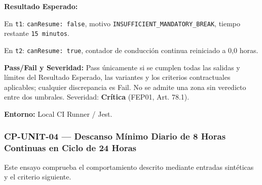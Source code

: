 \par\noindent\textbf{Resultado Esperado:} \par
   En \texttt{t\allowbreak{}1\allowbreak{}}: \texttt{c\allowbreak{}a\allowbreak{}n\allowbreak{}R\allowbreak{}e\allowbreak{}s\allowbreak{}u\allowbreak{}m\allowbreak{}e\allowbreak{}:\allowbreak{} f\allowbreak{}a\allowbreak{}l\allowbreak{}s\allowbreak{}e\allowbreak{}}, motivo \texttt{I\allowbreak{}N\allowbreak{}S\allowbreak{}U\allowbreak{}F\allowbreak{}F\allowbreak{}I\allowbreak{}C\allowbreak{}I\allowbreak{}E\allowbreak{}N\allowbreak{}T\allowbreak{}\_\allowbreak{}M\allowbreak{}A\allowbreak{}N\allowbreak{}D\allowbreak{}A\allowbreak{}T\allowbreak{}O\allowbreak{}R\allowbreak{}Y\allowbreak{}\_\allowbreak{}B\allowbreak{}R\allowbreak{}E\allowbreak{}A\allowbreak{}K\allowbreak{}}, tiempo restante \texttt{1\allowbreak{}5\allowbreak{} m\allowbreak{}i\allowbreak{}n\allowbreak{}u\allowbreak{}t\allowbreak{}o\allowbreak{}s\allowbreak{}}.\par
   En \texttt{t\allowbreak{}2\allowbreak{}}: \texttt{c\allowbreak{}a\allowbreak{}n\allowbreak{}R\allowbreak{}e\allowbreak{}s\allowbreak{}u\allowbreak{}m\allowbreak{}e\allowbreak{}:\allowbreak{} t\allowbreak{}r\allowbreak{}u\allowbreak{}e\allowbreak{}}, contador de conducción continua reiniciado a 0,0 horas.\par
\par\noindent\textbf{Pass/Fail y Severidad:} Pass únicamente si se cumplen todas las salidas y límites del Resultado Esperado, las variantes y los criterios contractuales aplicables; cualquier discrepancia es Fail. No se admite una zona sin veredicto entre dos umbrales. Severidad: \textbf{Crítica} (FEP01, Art. 78.1).\par
\par\noindent\textbf{Entorno:} Local CI Runner / Jest.\par






\subsubsection*{CP-UNIT-04 — Descanso Mínimo Diario de 8 Horas Continuas en Ciclo de 24 Horas}\label{sec:9-cp-unit-04}
Este ensayo comprueba el comportamiento descrito mediante entradas sintéticas y el criterio siguiente.

